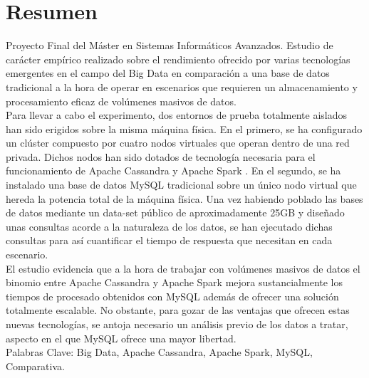 \section*{Resumen}

Proyecto Final del Máster en Sistemas Informáticos Avanzados. Estudio de carácter empírico realizado sobre el rendimiento ofrecido por varias tecnologías emergentes en el campo del Big Data en comparación a una base de datos tradicional a la hora de operar en escenarios que requieren un almacenamiento y procesamiento eficaz de volúmenes masivos de datos.\\

Para llevar a cabo el experimento, dos entornos de prueba totalmente aislados han sido erigidos sobre la misma máquina física. En el primero, se ha configurado un clúster compuesto por cuatro nodos virtuales que operan dentro de una red privada. Dichos nodos han sido dotados de tecnología necesaria para el funcionamiento de Apache Cassandra \cite{apachecassandra} y Apache Spark \cite{apachespark}. En el segundo, se ha instalado una base de datos MySQL tradicional sobre un único nodo virtual que hereda la potencia total de la máquina física. Una vez habiendo poblado las bases de datos mediante un data-set público de aproximadamente 25GB y diseñado unas consultas acorde a la naturaleza de los datos, se han ejecutado dichas consultas para así cuantificar el tiempo de respuesta que necesitan en cada escenario.\\

El estudio evidencia que a la hora de trabajar con volúmenes masivos de datos el binomio entre Apache Cassandra y Apache Spark mejora sustancialmente los tiempos de procesado obtenidos con MySQL además de ofrecer una solución totalmente escalable. No obstante, para gozar de las ventajas que ofrecen estas nuevas tecnologías, se antoja necesario un análisis previo de los datos a tratar, aspecto en el que MySQL ofrece una mayor libertad.\\


Palabras Clave: Big Data, Apache Cassandra, Apache Spark, MySQL, Comparativa.\\

